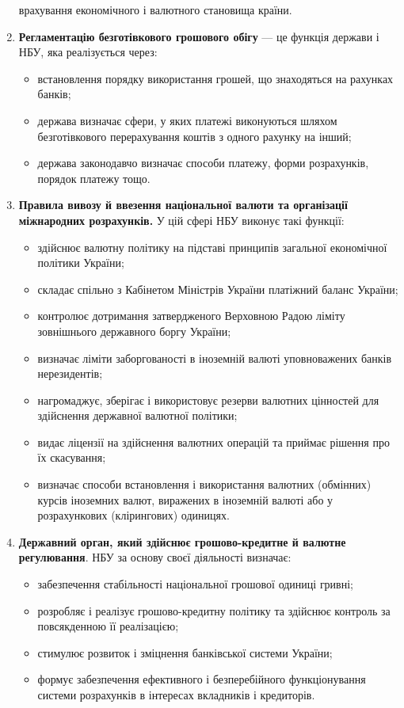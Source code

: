 \documentclass[a4paper,12pt,notitlepage,pdftex,headsepline]{scrartcl}
\begin{document}
\begin{enumerate}
      врахування економічного і валютного становища країни.
    \item \textbf{Регламентацію безготівкового грошового обігу} --- це функція держави і
      НБУ, яка реалізується через:
      \begin{itemize}
        \item встановлення порядку використання грошей, що знаходяться на рахунках банків;
        \item держава визначає сфери, у яких платежі виконуються шляхом безготівкового
          перерахування коштів з одного рахунку на інший;
        \item держава законодавчо визначає способи платежу, форми розрахунків, порядок
          платежу тощо.
      \end{itemize}
    \item \textbf{Правила вивозу й ввезення національної валюти та організації міжнародних
      розрахунків.}
      У цій сфері НБУ виконує такі функції:
      \begin{itemize}
        \item здійснює валютну політику на підставі принципів загальної економічної політики
          України;
        \item складає спільно з Кабінетом Міністрів України платіжний баланс України;
        \item контролює дотримання затвердженого Верховною Радою ліміту зовнішнього
          державного боргу України;
        \item визначає ліміти заборгованості в іноземній валюті уповноважених банків
          нерезидентів;
        \item нагромаджує, зберігає і використовує резерви валютних цінностей для здійснення
          державної валютної політики;
        \item видає ліцензії на здійснення валютних операцій та приймає рішення про їх
          скасування;
        \item визначає способи встановлення і використання валютних (обмінних) курсів
          іноземних валют, виражених в іноземній валюті або у розрахункових (клірингових)
          одиницях.
      \end{itemize}
    \item \textbf{Державний орган, який здійснює грошово-кредитне й валютне регулювання}.
      НБУ за основу своєї діяльності визначає:
      \begin{itemize}
        \item забезпечення стабільності національної грошової одиниці гривні;
        \item розробляє і реалізує грошово-кредитну політику та здійснює контроль за
          повсякденною її реалізацією;
        \item стимулює розвиток і зміцнення банківської системи України;
        \item формує забезпечення ефективного і безперебійного функціонування системи
          розрахунків в інтересах вкладників і кредиторів.
      \end{itemize}
  \end{enumerate}
\end{document}
